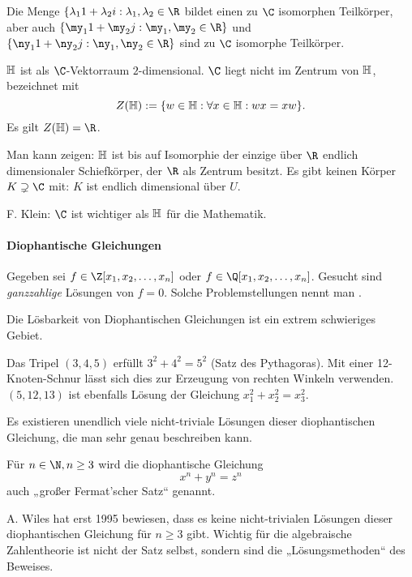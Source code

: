 Die Menge $\{ \lambda_1 1 + \lambda_2 i : \lambda_1, \lambda_2 \in \R$ bildet einen zu $\C$ isomorphen Teilkörper, aber auch $\{\my_1 1 + \my_2 j : \my_1, \my_2 \in \R\}$ und $\{\ny_1 1 + \ny_2 j : \ny_1, \ny_2 \in \R\}$ sind zu $\C$ isomorphe Teilkörper.

$\mathbb{H}$ ist als $\C$-Vektorraum $2$-dimensional.
$\C$ liegt nicht im Zentrum von $\mathbb{H}$, bezeichnet mit
\[
	Z(\mathbb{H}) := \{ w \in \mathbb{H} : \forall x \in \mathbb{H} : wx = xw \}.
\]
Es gilt $Z(\H) = \R$.

Man kann zeigen: $\mathbb{H}$ ist bis auf Isomorphie der einzige über $\R$ endlich dimensionaler Schiefkörper, der $\R$ als Zentrum besitzt.
Es gibt keinen Körper $K \supsetneq \C$ mit: $K$ ist endlich dimensional über $U$.

F. Klein: $\C$ ist wichtiger als $\mathbb{H}$ für die Mathematik.


\paragraph{Diophantische Gleichungen}

\begin{df}
	Gegeben sei $f \in \Z[x_1, x_2, \dotsc, x_n]$ oder $f \in \Q[x_1, x_2, \dotsc, x_n]$.
	Gesucht sind \emph{ganzzahlige} Lösungen von $f = 0$.
	Solche Problemstellungen nennt man .
\end{df}
Die Lösbarkeit von Diophantischen Gleichungen ist ein extrem schwieriges Gebiet.

\begin{ex}
	Das Tripel $(3, 4, 5)$ erfüllt $3^2 + 4^2 = 5^2$ (Satz des Pythagoras).
	Mit einer 12-Knoten-Schnur lässt sich dies zur Erzeugung von rechten Winkeln verwenden.
	$(5, 12, 13)$ ist ebenfalls Lösung der Gleichung $x_1^2 + x_2^2 = x_3^2$.

	Es existieren unendlich viele nicht-triviale Lösungen dieser diophantischen Gleichung, die man sehr genau beschreiben kann.
\end{ex}

\begin{ex}
	Für $n \in \N, n \ge 3$ wird die diophantische Gleichung
	\[
		x^n + y^n = z^n
	\]
	auch „großer Fermat'scher Satz“ genannt.

	A. Wiles hat erst 1995 bewiesen, dass es keine nicht-trivialen Lösungen dieser diophantischen Gleichung für $n \ge 3$ gibt.
	Wichtig für die algebraische Zahlentheorie ist nicht der Satz selbst, sondern sind die „Lösungsmethoden“ des Beweises.
\end{ex}

